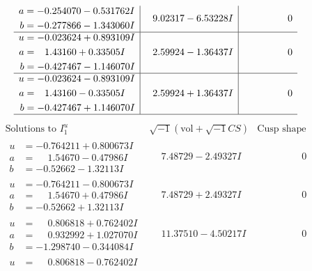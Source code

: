 \documentclass[1p]{elsarticle_modified}
\theoremstyle{definition}
\newcommand{\I}{\sqrt{-1}}
\begin{document}
$$\begin{array}{c|c|c}
\begin{aligned}
a &= -0.254070 - 0.531762 I \\
b &= -0.277866 - 1.343060 I\end{aligned}
 & \phantom{-}9.02317 - 6.53228 I & \phantom{-0.000000 } 0 \\ \hline\begin{aligned}
u &= -0.023624 + 0.893109 I \\
a &= \phantom{-}1.43160 + 0.33505 I \\
b &= -0.427467 - 1.146070 I\end{aligned}
 & \phantom{-}2.59924 - 1.36437 I & \phantom{-0.000000 } 0 \\ \hline\begin{aligned}
u &= -0.023624 - 0.893109 I \\
a &= \phantom{-}1.43160 - 0.33505 I \\
b &= -0.427467 + 1.146070 I\end{aligned}
 & \phantom{-}2.59924 + 1.36437 I & \phantom{-0.000000 } 0\\
 \hline 
 \end{array}$$\newpage$$\begin{array}{c|c|c}  
\text{Solutions to }I^u_{1}& \I (\text{vol} + \sqrt{-1}CS) & \text{Cusp shape}\\
 \hline 
\begin{aligned}
u &= -0.764211 + 0.800673 I \\
a &= \phantom{-}1.54670 - 0.47986 I \\
b &= -0.52662 - 1.32113 I\end{aligned}
 & \phantom{-}7.48729 - 2.49327 I & \phantom{-0.000000 } 0 \\ \hline\begin{aligned}
u &= -0.764211 - 0.800673 I \\
a &= \phantom{-}1.54670 + 0.47986 I \\
b &= -0.52662 + 1.32113 I\end{aligned}
 & \phantom{-}7.48729 + 2.49327 I & \phantom{-0.000000 } 0 \\ \hline\begin{aligned}
u &= \phantom{-}0.806818 + 0.762402 I \\
a &= \phantom{-}0.932992 + 1.027070 I \\
b &= -1.298740 - 0.344084 I\end{aligned}
 & \phantom{-}11.37510 - 4.50217 I & \phantom{-0.000000 } 0 \\ \hline\begin{aligned}
u &= \phantom{-}0.806818 - 0.762402 I \\

\end{aligned}
\end{array}$$
\end{document}
